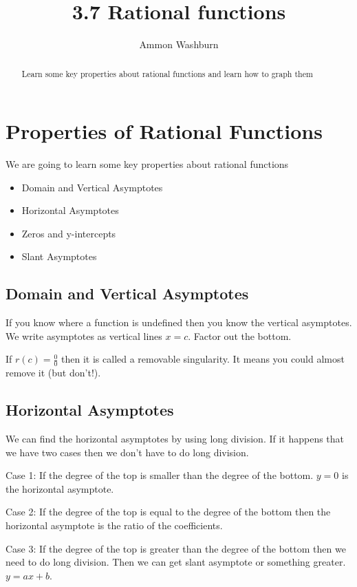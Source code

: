\documentclass{tufte-handout}
\title{3.7 Rational functions}
\author[AW]{Ammon Washburn}
\begin{document}
\maketitle


\begin{abstract}
Learn some key properties about rational functions and learn how to graph them
\end{abstract}

\section{Properties of Rational Functions}

We are going to learn some key properties about rational functions

\begin{itemize}
\item Domain and Vertical Asymptotes
\item Horizontal Asymptotes
\item Zeros and y-intercepts
\item Slant Asymptotes
\end{itemize}

\subsection{Domain and Vertical Asymptotes}

If you know where a function is undefined then you know the vertical asymptotes.  We write asymptotes as vertical lines $x=c$.  Factor out the bottom.

If $r(c) = \frac{0}{0}$ then it is called a removable singularity.  It means you could almost remove it (but don't!).

\subsection{Horizontal Asymptotes}

We can find the horizontal asymptotes by using long division.  If it happens that we have two cases then we don't have to do long division.

Case 1: If the degree of the top is smaller than the degree of the bottom. $y=0$ is the horizontal asymptote.  

Case 2: If the degree of the top is equal to the degree of the bottom then the horizontal asymptote is the ratio of the coefficients.

Case 3: If the degree of the top is greater than the degree of the bottom then we need to do long division.  Then we can get slant asymptote or something greater. $y=ax+b$.
\end{document}
